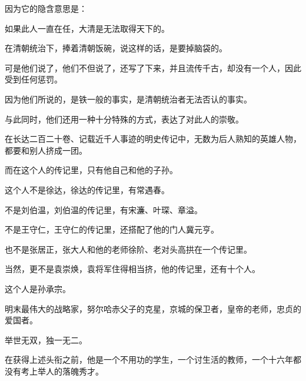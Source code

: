 \begin{multicols}{\theparacolNo}
因为它的隐含意思是：

如果此人一直在任，大清是无法取得天下的。

在清朝统治下，捧着清朝饭碗，说这样的话，是要掉脑袋的。

可是他们说了，他们不但说了，还写了下来，并且流传千古，却没有一个人，因此受到任何惩罚。

因为他们所说的，是铁一般的事实，是清朝统治者无法否认的事实。

与此同时，他们还用一种十分特殊的方式，表达了对此人的崇敬。

在长达二百二十卷、记载近千人事迹的明史传记中，无数为后人熟知的英雄人物，都要和别人挤成一团。

而在这个人的传记里，只有他自己和他的子孙。

这个人不是徐达，徐达的传记里，有常遇春。

不是刘伯温，刘伯温的传记里，有宋濂、叶琛、章溢。

不是王守仁，王守仁的传记里，还搭配了他的门人冀元亨。

也不是张居正，张大人和他的老师徐阶、老对头高拱在一个传记里。

当然，更不是袁崇焕，袁将军住得相当挤，他的传记里，还有十个人。

这个人是孙承宗。

明末最伟大的战略家，努尔哈赤父子的克星，京城的保卫者，皇帝的老师，忠贞的爱国者。

举世无双，独一无二。

在获得上述头衔之前，他是一个不用功的学生，一个讨生活的教师，一个十六年都没有考上举人的落魄秀才。

\ifnum{}
	\end{multicols}
\fi
\newpage
